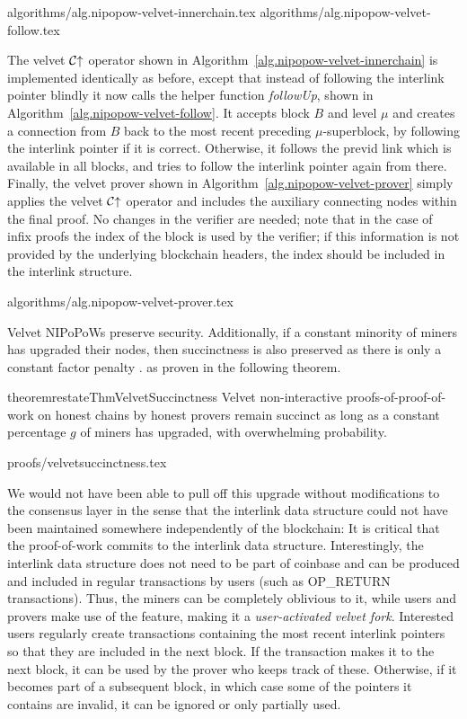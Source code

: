 {algorithms/alg.nipopow-velvet-innerchain.tex}
{algorithms/alg.nipopow-velvet-follow.tex}

The velvet $\mathcal{C}\negthickspace\uparrow$ operator shown in
Algorithm~\ref{alg.nipopow-velvet-innerchain} is implemented identically as
before, except that instead of following the interlink pointer blindly it now
calls the helper function \textit{followUp}, shown in
Algorithm~\ref{alg.nipopow-velvet-follow}. It accepts block $B$ and level $\mu$
and creates a connection from $B$ back to the most recent preceding
$\mu$-superblock, by following the interlink pointer if it is correct.
Otherwise, it follows the previd link which is available in all blocks, and
tries to follow the interlink pointer again from there. Finally, the velvet
prover shown in Algorithm~\ref{alg.nipopow-velvet-prover} simply applies the
velvet $\mathcal{C}\negthickspace\uparrow$ operator and includes the auxiliary connecting nodes
within the final proof. No changes in the verifier are needed; note that  in the
case of infix proofs the $\mathrm{index}$ of the block is used by the verifier;
if this information is not provided by the underlying blockchain headers, the
index should be included in the interlink structure.

{algorithms/alg.nipopow-velvet-prover.tex}

Velvet NIPoPoWs preserve security. Additionally, if a constant minority of
miners has upgraded their nodes, then succinctness is also preserved
as there is only a constant factor penalty\ifndss
.
\else
 as proven in the following theorem.
\begin{restatable}{theorem}{restateThmVelvetSuccinctness}
    \label{thm.velvet-succinctness}
    Velvet non-interactive proofs-of-proof-of-work on honest chains by honest
    provers remain succinct as long as a constant percentage $g$ of miners has
    upgraded, with overwhelming probability.
\end{restatable}
{proofs/velvetsuccinctness.tex}
\fi

We would not have been able to pull off this upgrade without modifications to
the consensus layer in the sense that the interlink data structure could not
have been maintained somewhere independently of the blockchain: It is critical
that the proof-of-work commits to the interlink data structure. Interestingly,
the interlink data structure does not need to be part of coinbase and can be
produced and included in regular transactions by users (such as OP\_RETURN
transactions). Thus, the miners can be completely oblivious to it, while users
and provers make use of the feature, making it a \emph{user-activated velvet
fork}. Interested users regularly create transactions containing the most recent
interlink pointers so that they are included in the next block. If the
transaction makes it to the next block, it can be used by the prover who keeps
track of these. Otherwise, if it becomes part of a subsequent block, in which
case some of the pointers it contains are invalid, it can be ignored or only
partially used.

